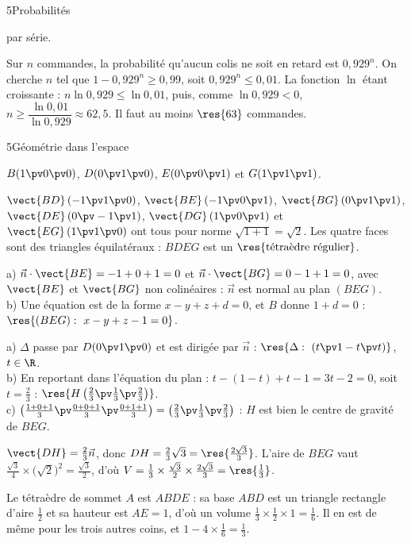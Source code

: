 \begin{corrigeBac}{5}{Probabilités}
\begin{questions}[resume]
    par série. 
\end{questions}
\begin{questions}[resume]
  \item Sur $n$ commandes, la probabilité qu'aucun colis ne soit en retard est $0{,}929^{n}$. On cherche $n$ tel que
    $1-0{,}929^{n}\geq0{,}99$, soit $0{,}929^{n}\leq0{,}01$. La fonction $\ln$ étant croissante :
    $n\ln0{,}929\leq\ln0{,}01$, puis, comme $\ln0{,}929<0$, $n\geq\dfrac{\ln0{,}01}{\ln0{,}929}\approx62{,}5$. Il faut au moins
    $\res{63}$ commandes. 
\end{questions}
\end{corrigeBac}

\begin{corrigeBac}{5}{Géométrie dans l'espace}
\begin{questions}
  \item $B(1\pv0\pv0)$, $D(0\pv1\pv0)$, $E(0\pv0\pv1)$ et $G(1\pv1\pv1)$. 
  \item $\vect{BD}\,(-1\pv1\pv0)$, $\vect{BE}\,(-1\pv0\pv1)$, $\vect{BG}\,(0\pv1\pv1)$, $\vect{DE}\,(0\pv-1\pv1)$, $\vect{DG}\,(1\pv0\pv1)$ et
    $\vect{EG}\,(1\pv1\pv0)$ ont tous pour norme $\sqrt{1+1}=\sqrt2$. Les quatre faces sont des triangles équilatéraux : $BDEG$ est un
    $\res{\text{tétraèdre régulier}}$. 
  \item a) $\vec n\cdot\vect{BE}=-1+0+1=0$ et $\vec n\cdot\vect{BG}=0-1+1=0$, avec $\vect{BE}$ et $\vect{BG}$ non colinéaires : $\vec n$
    est normal au plan $(BEG)$.\\
    b) Une équation est de la forme $x-y+z+d=0$, et $B$ donne $1+d=0$ : $\res{(BEG):\ x-y+z-1=0}$. \pts{1 pt}
  \item a) $\Delta$ passe par $D(0\pv1\pv0)$ et est dirigée par $\vec n$ : $\res{\Delta:\ (t\pv1-t\pv t)}$, $t\in\R$.\\
    b) En reportant dans l'équation du plan : $t-(1-t)+t-1=3t-2=0$, soit $t=\frac23$ : $\res{H\left(\tfrac23\pv\tfrac13\pv\tfrac23\right)}$.\\
    c) $\left(\frac{1+0+1}{3}\pv\frac{0+0+1}{3}\pv\frac{0+1+1}{3}\right)=\left(\frac23\pv\frac13\pv\frac23\right)$ : $H$ est bien le centre de
    gravité de $BEG$. 
  \item $\vect{DH}=\frac23\vec n$, donc $DH=\frac23\sqrt3=\res{\tfrac{2\sqrt3}{3}}$. L'aire de $BEG$ vaut $\frac{\sqrt3}{4}\times\big(\sqrt2\big)^2=\frac{\sqrt3}{2}$,
    d'où $V=\frac13\times\frac{\sqrt3}{2}\times\frac{2\sqrt3}{3}=\res{\tfrac13}$. 
  \item Le tétraèdre de sommet $A$ est $ABDE$ : sa base $ABD$ est un triangle rectangle d'aire $\frac12$ et sa hauteur est $AE=1$, d'où un
    volume $\frac13\times\frac12\times1=\frac16$. Il en est de même pour les trois autres coins, et $1-4\times\frac16=\frac13$. 
\end{questions}
\end{corrigeBac}

